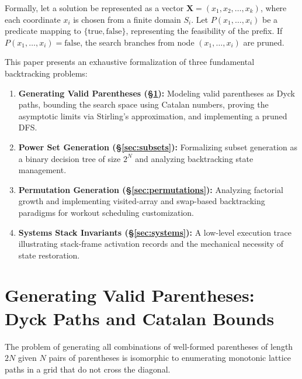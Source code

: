 \documentclass[10pt,journal,compsoc,onecolumn]{IEEEtran}
\begin{document}
Formally, let a solution be represented as a vector $\mathbf{X} = (x_1, x_2, \ldots, x_k)$, where each coordinate $x_i$ is chosen from a finite domain $S_i$. Let $P(x_1, \ldots, x_i)$ be a predicate mapping to $\{\text{true}, \text{false}\}$, representing the feasibility of the prefix. If $P(x_1, \ldots, x_i) = \text{false}$, the search branches from node $(x_1, \ldots, x_i)$ are pruned.

This paper presents an exhaustive formalization of three fundamental backtracking problems:
\begin{enumerate}
    \item \textbf{Generating Valid Parentheses (\S\ref{sec:parentheses}):} Modeling valid parentheses as Dyck paths, bounding the search space using Catalan numbers, proving the asymptotic limits via Stirling's approximation, and implementing a pruned DFS.
    \item \textbf{Power Set Generation (\S\ref{sec:subsets}):} Formalizing subset generation as a binary decision tree of size $2^N$ and analyzing backtracking state management.
    \item \textbf{Permutation Generation (\S\ref{sec:permutations}):} Analyzing factorial growth and implementing visited-array and swap-based backtracking paradigms for workout scheduling customization.
    \item \textbf{Systems Stack Invariants (\S\ref{sec:systems}):} A low-level execution trace illustrating stack-frame activation records and the mechanical necessity of state restoration.
\end{enumerate}

\section{Generating Valid Parentheses: Dyck Paths and Catalan Bounds}
\label{sec:parentheses}

The problem of generating all combinations of well-formed parentheses of length $2N$ given $N$ pairs of parentheses is isomorphic to enumerating monotonic lattice paths in a grid that do not cross the diagonal.
\end{document}
